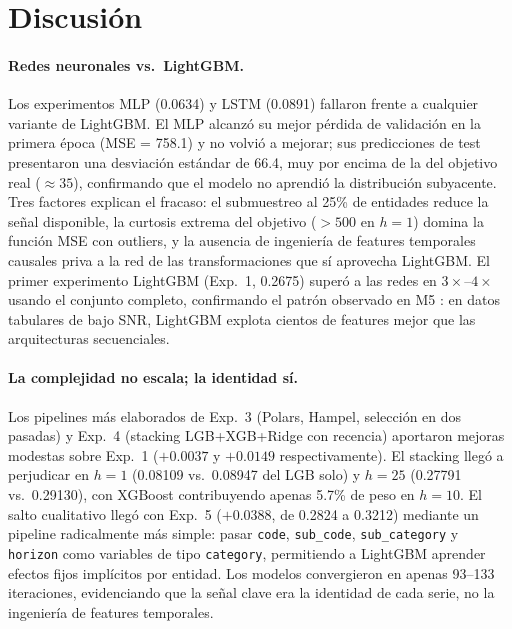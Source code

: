 \documentclass{article}
\begin{document}

\section{Discusión}

\paragraph{Redes neuronales vs.\ LightGBM.}
Los experimentos MLP (0.0634) y LSTM (0.0891) fallaron frente a cualquier variante de LightGBM. El MLP alcanzó su mejor pérdida de validación en la primera época (MSE = 758.1) y no volvió a mejorar; sus predicciones de test presentaron una desviación estándar de 66.4, muy por encima de la del objetivo real ($\approx 35$), confirmando que el modelo no aprendió la distribución subyacente. Tres factores explican el fracaso: el submuestreo al 25\% de entidades reduce la señal disponible, la curtosis extrema del objetivo ($>500$ en $h=1$) domina la función MSE con outliers, y la ausencia de ingeniería de features temporales causales priva a la red de las transformaciones que sí aprovecha LightGBM. El primer experimento LightGBM (Exp.~1, 0.2675) superó a las redes en $3\times$--$4\times$ usando el conjunto completo, confirmando el patrón observado en M5 \citep{makridakis2022m5}: en datos tabulares de bajo SNR, LightGBM explota cientos de features mejor que las arquitecturas secuenciales.

\paragraph{La complejidad no escala; la identidad sí.}
Los pipelines más elaborados de Exp.~3 (Polars, Hampel, selección en dos pasadas) y Exp.~4 (stacking LGB+XGB+Ridge con recencia) aportaron mejoras modestas sobre Exp.~1 ($+0.0037$ y $+0.0149$ respectivamente). El stacking llegó a perjudicar en $h=1$ (0.08109 vs.\ 0.08947 del LGB solo) y $h=25$ (0.27791 vs.\ 0.29130), con XGBoost contribuyendo apenas 5.7\% de peso en $h=10$. El salto cualitativo llegó con Exp.~5 ($+0.0388$, de 0.2824 a 0.3212) mediante un pipeline radicalmente más simple: pasar \texttt{code}, \texttt{sub\_code}, \texttt{sub\_category} y \texttt{horizon} como variables de tipo \texttt{category}, permitiendo a LightGBM aprender efectos fijos implícitos por entidad. Los modelos convergieron en apenas 93--133 iteraciones, evidenciando que la señal clave era la identidad de cada serie, no la ingeniería de features temporales.
\end{document}
